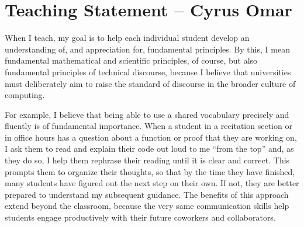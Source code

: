 \documentclass[9pt]{extarticle}
\begin{document}
\vspace{-8px}
\section*{Teaching Statement -- Cyrus Omar}
\vspace{-6px}


When I teach, my goal is to help each individual student develop an understanding of, and appreciation for, fundamental principles. By this, I mean fundamental mathematical and scientific principles, of course, but also fundamental principles of technical discourse, because I believe that universities must deliberately aim to raise the standard of discourse in the broader culture of computing.

For example, I believe that being able to use a {shared vocabulary} precisely and fluently is of fundamental importance. 
When a student in a recitation section or in office hours has a question about a function or proof that they are working on, I ask them to read and explain their code out loud to me ``from the top'' and, as they do so, I help them rephrase their reading until it is clear and correct. This prompts them to organize their thoughts, so that by the time they have finished, many students have figured out the next step on their own.
%
%
If not, they are better prepared to understand my subsequent guidance. %
The benefits of this approach extend beyond the classroom, because the very same communication skills help students engage productively with their future coworkers and collaborators. 
\end{document}
